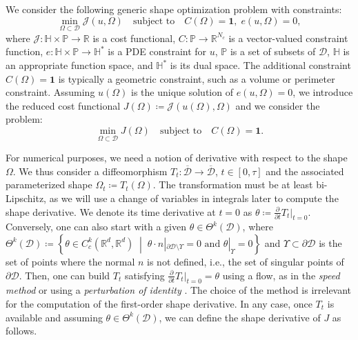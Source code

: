 \documentclass[preprint,9pt]{elsarticle}
\begin{document}
We consider the following generic shape optimization problem with constraints:
\begin{equation}\label{eq:problem0}
	\min_{\Omega\subset\mathcal{D}} \mathcal{J}(u,\Omega)
	\quad\text{subject to}\quad C(\Omega)=\boldsymbol{1},\; e(u,\Omega)=0,
\end{equation}
where $\mathcal{J}\colon\mathbb{H}\times\mathds{P}\to\mathds{R}$ is a cost functional, 
$C\colon\mathds{P}\to\mathds{R}^{N_c}$ is a vector-valued constraint function,
$e\colon\mathbb{H}\times\mathds{P}\to\mathbb{H}^*$ is a PDE constraint for $u$,
$\mathds{P}$ is a set of subsets of $\mathcal{D}$,
$\mathbb{H}$ is an appropriate function space, and $\mathbb{H}^*$ is its dual space.
The additional constraint $C(\Omega)=\boldsymbol{1}$ is
typically a geometric constraint, such as a volume or perimeter constraint.
Assuming $u(\Omega)$ is the unique solution of $e(u,\Omega)=0$, 
we introduce the reduced cost functional
$J(\Omega)\coloneqq\mathcal{J}(u(\Omega),\Omega)$
and we consider the problem:
\begin{equation}\label{eq:problem}
	\min_{\Omega\subset\mathcal{D}} J(\Omega)
	\quad\text{subject to}\quad C(\Omega)=\boldsymbol{1}.
\end{equation}

For numerical purposes, we need a notion of derivative with respect
to the shape $\Omega$.
We thus consider a diffeomorphism
$T_t\colon\overline{\mathcal{D}}\to\overline{\mathcal{D}}$, $t\in [0,\tau]$
and the associated parameterized shape $\Omega_t\coloneqq T_t(\Omega)$.
The transformation must be at least bi-Lipschitz, as we will use a change
of variables in integrals later to compute the shape derivative.
We denote its time derivative at $t=0$ as
$\theta\coloneqq\frac{\partial}{\partial t}T_t|_{t=0}$.
Conversely, one can also start with a given $\theta\in\Theta^k(\mathcal{D})$,
where
$
	\Theta^k(\mathcal{D})\coloneqq
	\left\{
		\theta \in C^k_c(\mathds{R}^d,\mathds{R}^d)
		\;\middle|\;
		{\theta\cdot n}|_{\partial\mathcal{D}\setminus \Upsilon} = 0
		\text{ and }
		\theta|_\Upsilon = 0
	\right\}
$
and $\Upsilon\subset\partial\mathcal{D}$ is the set of points
where the normal $n$ is not defined, i.e.,
the set of singular points of $\partial\mathcal{D}$.
Then, one can build $T_t$ satisfying
$\frac{\partial}{\partial t} T_t|_{t=0}=\theta$ using a flow,
as in the {\it speed method} \cite{MR2731611,MR1215733} or
using a {\it perturbation of identity} \cite{MR2512810}.
The choice of the method is irrelevant for the computation
of the first-order shape derivative.
In any case, once $T_t$ is available and assuming
$\theta\in\Theta^k(\mathcal{D})$, we can define
the shape derivative of $J$ as follows.
\end{document}
